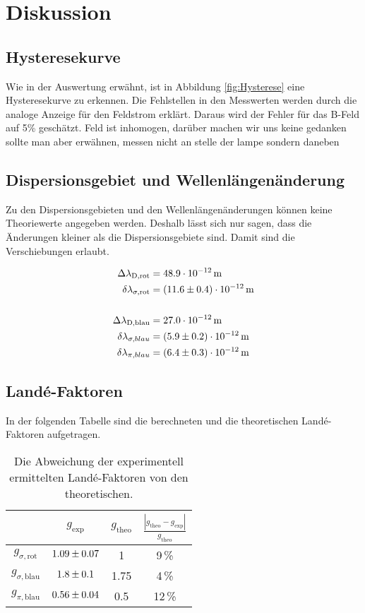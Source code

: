 \section{Diskussion}
\label{sec:Diskussion}
\subsection{Hysteresekurve}
Wie in der Auswertung erwähnt, ist in Abbildung \eqref{fig:Hysterese} eine Hysteresekurve zu erkennen. Die Fehlstellen in den Messwerten werden durch die analoge Anzeige für den Feldstrom erklärt. Daraus wird der Fehler für das B-Feld auf 5\% geschätzt.
Feld ist inhomogen, darüber machen wir uns keine gedanken sollte man aber erwähnen, messen nicht an stelle der lampe sondern daneben

\subsection{Dispersionsgebiet und Wellenlängenänderung}
Zu den Dispersionsgebieten und den Wellenlängenänderungen können keine Theoriewerte angegeben werden. Deshalb lässt sich nur sagen, dass die Änderungen kleiner als die Dispersionsgebiete sind. Damit sind die Verschiebungen erlaubt.

\begin{align*}
  \Delta\lambda_\text{D,rot} &= 48.9 \cdot 10^{-12}\,\text{m} \\
  \delta \lambda_{\sigma,\text{rot}} &= (\num{11.6 +- 0.4})\cdot 10^{-12}\,\text{m} \\
  \\
  \Delta\lambda_\text{D,blau} &= 27.0 \cdot 10^{-12}\,\text{m} \\
  \delta \lambda_{\sigma,blau} &= (\num{5.9 +- 0.2})\cdot 10^{-12}\,\text{m} \\
  \delta \lambda_{\pi,blau} &= (\num{6.4 +- 0.3})\cdot 10^{-12}\,\text{m}
\end{align*}


\subsection{Landé-Faktoren}
In der folgenden Tabelle sind die berechneten und die theoretischen Landé-Faktoren aufgetragen.

\begin{table}[H]
   \centering
   \caption{Die Abweichung der experimentell ermittelten Landé-Faktoren von den theoretischen.}
   \label{tab:}
   \begin{tabular}{c|c|c|c}
     & $g_\text{exp}$ & $g_\text{theo}$ & $\frac{|g_\text{theo} - g_\text{exp}|}{g_\text{theo}}$ \\
     \hline
     $g_{\sigma,\text{rot}}$  & $\num{1.09 +- 0.07}$ & 1 & 9\,\% \\
     $g_{\sigma,\text{blau}}$ & $\num{1.8 +- 0.1}$   & 1.75 & 4\,\% \\
     $g_{\pi,\text{blau}}$    & $\num{0.56 +- 0.04}$ & 0.5 & 12\,\% \\
   \end{tabular}
\end{table}

